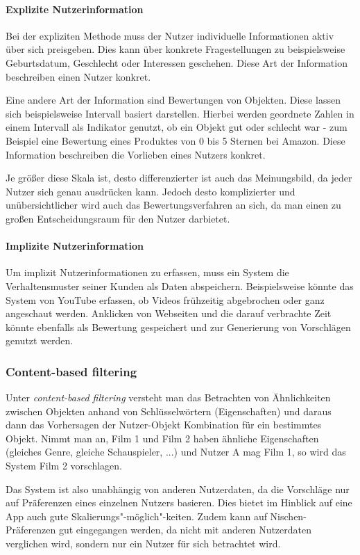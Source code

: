 \paragraph{Explizite Nutzerinformation}
Bei der expliziten Methode muss der Nutzer individuelle Informationen aktiv über sich preisgeben. Dies kann über konkrete Fragestellungen zu beispielsweise Geburtsdatum, Geschlecht oder Interessen geschehen. Diese Art der Information beschreiben einen Nutzer konkret. 

\noindent
Eine andere Art der Information sind Bewertungen von Objekten. Diese lassen sich beispielsweise Intervall basiert darstellen. Hierbei werden geordnete Zahlen in einem Intervall als Indikator genutzt, ob ein Objekt gut oder schlecht war - zum Beispiel eine Bewertung eines Produktes von 0 bis 5 Sternen bei Amazon. Diese Information beschreiben die Vorlieben eines Nutzers konkret.

\noindent
Je größer diese Skala ist, desto differenzierter ist auch das Meinungsbild, da jeder Nutzer sich genau ausdrücken kann. Jedoch desto komplizierter und unübersichtlicher wird auch das Bewertungsverfahren an sich, da man einen zu großen Entscheidungsraum für den Nutzer darbietet.

\paragraph{Implizite Nutzerinformation}
Um implizit Nutzerinformationen zu erfassen, muss ein System die Verhaltensmuster seiner Kunden als Daten abspeichern. Beispielsweise könnte das System von YouTube erfassen, ob Videos frühzeitig abgebrochen oder ganz angeschaut werden. Anklicken von Webseiten und die darauf verbrachte Zeit könnte ebenfalls als Bewertung gespeichert und zur Generierung von Vorschlägen genutzt werden.

\subsubsection{Content-based filtering}
Unter \textit{content-based filtering} versteht man das Betrachten von Ähnlichkeiten zwischen Objekten anhand von Schlüsselwörtern (Eigenschaften) und daraus dann das Vorhersagen der Nutzer-Objekt Kombination für ein bestimmtes Objekt. 
Nimmt man an, Film 1 und Film 2 haben ähnliche Eigenschaften (gleiches Genre, gleiche Schauspieler, ...) und Nutzer A mag Film 1, so wird das System Film 2 vorschlagen.

\noindent
Das System ist also unabhängig von anderen Nutzerdaten, da die Vorschläge nur auf Präferenzen eines einzelnen Nutzers basieren. Dies bietet im Hinblick auf eine App auch gute Skalierungs"-möglich"-keiten. Zudem kann auf Nischen-Präferenzen gut eingegangen werden, da nicht mit anderen Nutzerdaten verglichen wird, sondern nur ein Nutzer für sich betrachtet wird.

